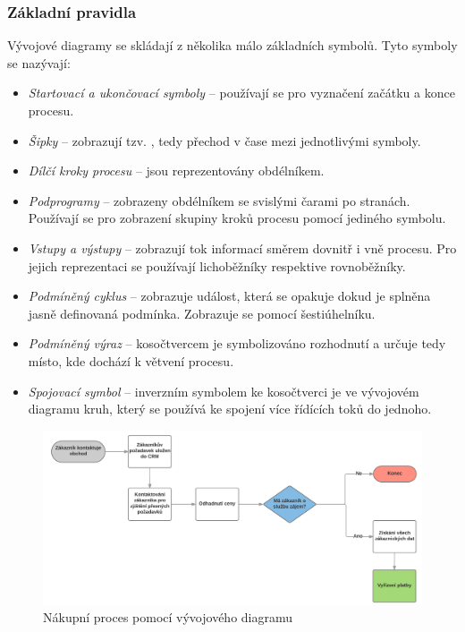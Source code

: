 \subsubsection{Základní pravidla}
Vývojové diagramy se skládají z několika málo základních symbolů. Tyto symboly se nazývají: \cite{Chytil2005}

\begin{itemize}
\item \textit{Startovací a ukončovací symboly} – používají se pro vyznačení začátku a konce procesu.
\item \textit{Šipky} – zobrazují tzv. , tedy přechod v čase mezi jednotlivými symboly.
\item \textit{Dílčí kroky procesu} – jsou reprezentovány obdélníkem.
\item \textit{Podprogramy} – zobrazeny obdélníkem se svislými čarami po stranách. Používají se pro zobrazení skupiny kroků procesu pomocí jediného symbolu.
\item \textit{Vstupy a výstupy} – zobrazují tok informací směrem dovnitř i vně procesu. Pro jejich reprezentaci se používají lichoběžníky respektive rovnoběžníky.
\item \textit{Podmíněný cyklus} – zobrazuje událost, která se opakuje dokud je splněna jasně definovaná podmínka. Zobrazuje se pomocí šestiúhelníku.
\item \textit{Podmíněný výraz} – kosočtvercem je symbolizováno rozhodnutí a určuje tedy místo, kde dochází k větvení procesu.
\item \textit{Spojovací symbol} – inverzním symbolem ke kosočtverci je ve vývojovém diagramu kruh, který se používá ke spojení více řídících toků do jednoho.
\end{itemize}

\begin{figure}[H]\centering %
\includegraphics[width=1.0\textwidth]{obrazky/flowchart}
\caption{Nákupní proces pomocí vývojového diagramu}
\label{fig:Flowchart}
\end{figure}

